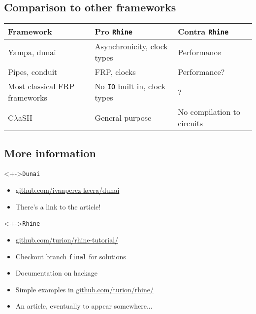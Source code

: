 \documentclass{enigtex-beamer-base}
\begin{document}
\subsection{Comparison to other frameworks}

\begin{frame}[fragile]
	\begin{tabular}{p{2.5cm}p{3.5cm}p{3.5cm}}
		\toprule
		\textbf{Framework}
			& \textbf{Pro \texttt{Rhine}}
				& \textbf{Contra \texttt{Rhine}}
		\\\midrule
		Yampa, dunai
			& Asynchronicity, clock types
				& Performance
		\\\midrule
		Pipes, conduit
			& FRP, clocks
				& Performance?
		\\\midrule
		Most classical FRP frameworks
			& No \texttt{IO} built in, clock types
				& ?
		\\\midrule
		C$\lambda$aSH
			& General purpose
				& No compilation to circuits
	\end{tabular}
\end{frame}

\subsection{More information}

\begin{frame}
	\begin{block}<+->{\texttt{Dunai}}
		\begin{itemize}[<+->]
			\item  \href{https://github.com/ivanperez-keera/dunai}{github.com/ivanperez-keera/dunai}
			\item There's a link to the article!
		\end{itemize}
	\end{block}
	\begin{block}<+->{\texttt{Rhine}}
		\begin{itemize}[<+->]
			\item \href{https://github.com/turion/rhine-tutorial/}{github.com/turion/rhine-tutorial/}
			\item Checkout branch \texttt{final} for solutions
			\item Documentation on hackage
			\item Simple examples in \href{https://github.com/turion/rhine/}{github.com/turion/rhine/}
			\item An article, eventually to appear somewhere...
		\end{itemize}
	\end{block}
\end{frame}
\end{document}
